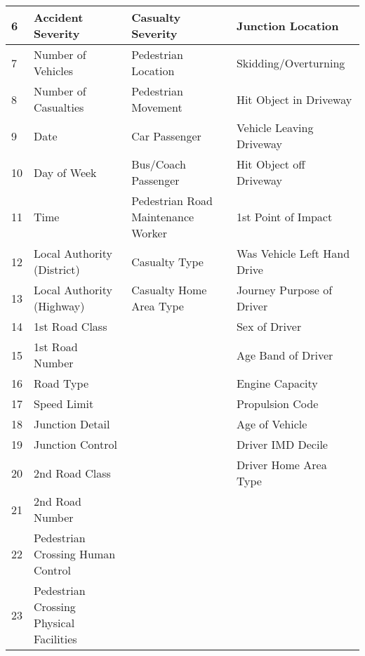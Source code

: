 \documentclass[letterpaper,10pt,openany,oneside]{sphinxmanual}
\begin{document}
\begin{longtable}{|l|l|l|l|}
6
 & 
Accident Severity
 & 
Casualty Severity
 & 
Junction Location
\\\hline

7
 & 
Number of Vehicles
 & 
Pedestrian Location
 & 
Skidding/Overturning
\\\hline

8
 & 
Number of Casualties
 & 
Pedestrian Movement
 & 
Hit Object in Driveway
\\\hline

9
 & 
Date
 & 
Car Passenger
 & 
Vehicle Leaving Driveway
\\\hline

10
 & 
Day of Week
 & 
Bus/Coach Passenger
 & 
Hit Object off Driveway
\\\hline

11
 & 
Time
 & 
Pedestrian Road  Maintenance Worker
 & 
1st Point of Impact
\\\hline

12
 & 
Local Authority (District)
 & 
Casualty Type
 & 
Was Vehicle Left Hand Drive
\\\hline

13
 & 
Local Authority (Highway)
 & 
Casualty Home Area Type
 & 
Journey Purpose of Driver
\\\hline

14
 & 
1st Road Class
 &  & 
Sex of Driver
\\\hline

15
 & 
1st Road Number
 &  & 
Age Band of Driver
\\\hline

16
 & 
Road Type
 &  & 
Engine Capacity
\\\hline

17
 & 
Speed Limit
 &  & 
Propulsion Code
\\\hline

18
 & 
Junction Detail
 &  & 
Age of Vehicle
\\\hline

19
 & 
Junction Control
 &  & 
Driver IMD Decile
\\\hline

20
 & 
2nd Road Class
 &  & 
Driver Home Area Type
\\\hline

21
 & 
2nd Road Number
 &  & \\\hline

22
 & 
Pedestrian Crossing Human Control
 &  & \\\hline

23
 & 
Pedestrian Crossing Physical Facilities
 &  & \\\hline


\end{longtable}
\end{document}
